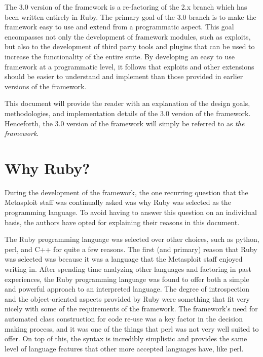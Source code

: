 \documentclass{report}
\begin{document}
\par
The 3.0 version of the framework is a re-factoring of the 2.x branch
which has been written entirely in Ruby.  The primary goal of the
3.0 branch is to make the framework easy to use and extend from a
programmatic aspect.  This goal encompasses not only the development
of framework modules, such as exploits, but also to the development
of third party tools and plugins that can be used to increase the
functionality of the entire suite.  By developing an easy to use
framework at a programmatic level, it follows that exploits and
other extensions should be easier to understand and implement than
those provided in earlier versions of the framework.

\par
This document will provide the reader with an explanation of the
design goals, methodologies, and implementation details of the 3.0
version of the framework.  Henceforth, the 3.0 version of the
framework will simply be referred to as \textit{the framework}.

    \section{Why Ruby?}

\par
During the development of the framework, the one recurring question
that the Metasploit staff was continually asked was why Ruby was
selected as the programming language.  To avoid having to answer
this question on an individual basis, the authors have opted for
explaining their reasons in this document.

\par
The Ruby programming language was selected over other choices, such
as python, perl, and C++ for quite a few reasons.  The first (and
primary) reason that Ruby was selected was because it was a language
that the Metasploit staff enjoyed writing in. After spending time
analyzing other languages and factoring in past experiences, the
Ruby programming language was found to offer both a simple and
powerful approach to an interpreted language.  The degree of
introspection and the object-oriented aspects provided by Ruby were
something that fit very nicely with some of the requirements of the
framework.  The framework's need for automated class construction
for code re-use was a key factor in the decision making process, and
it was one of the things that perl was not very well suited to
offer. On top of this, the syntax is incredibly simplistic and
provides the same level of language features that other more
accepted languages have, like perl.
\end{document}
